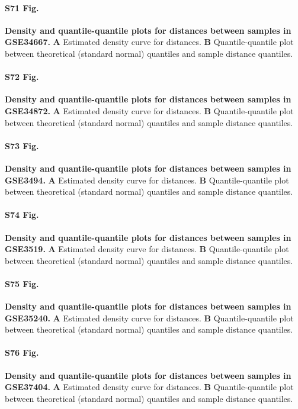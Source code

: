 \documentclass[10pt,letterpaper]{article}
\begin{document}
\paragraph*{S71 Fig.}
\hypertarget{S71_Fig}{
{\bf Density and quantile-quantile plots for distances between samples in GSE34667.} \textbf{A} Estimated density curve for distances. \textbf{B} Quantile-quantile plot between theoretical (standard normal) quantiles and sample distance quantiles.}

\paragraph*{S72 Fig.}
\hypertarget{S72_Fig}{
{\bf Density and quantile-quantile plots for distances between samples in GSE34872.} \textbf{A} Estimated density curve for distances. \textbf{B} Quantile-quantile plot between theoretical (standard normal) quantiles and sample distance quantiles.}

\paragraph*{S73 Fig.}
\hypertarget{S73_Fig}{
{\bf Density and quantile-quantile plots for distances between samples in GSE3494.} \textbf{A} Estimated density curve for distances. \textbf{B} Quantile-quantile plot between theoretical (standard normal) quantiles and sample distance quantiles.}

\paragraph*{S74 Fig.}
\hypertarget{S74_Fig}{
{\bf Density and quantile-quantile plots for distances between samples in GSE3519.} \textbf{A} Estimated density curve for distances. \textbf{B} Quantile-quantile plot between theoretical (standard normal) quantiles and sample distance quantiles.}

\paragraph*{S75 Fig.}
\hypertarget{S75_Fig}{
{\bf Density and quantile-quantile plots for distances between samples in GSE35240.} \textbf{A} Estimated density curve for distances. \textbf{B} Quantile-quantile plot between theoretical (standard normal) quantiles and sample distance quantiles.}

\paragraph*{S76 Fig.}
\hypertarget{S76_Fig}{
{\bf Density and quantile-quantile plots for distances between samples in GSE37404.} \textbf{A} Estimated density curve for distances. \textbf{B} Quantile-quantile plot between theoretical (standard normal) quantiles and sample distance quantiles.}
\end{document}

